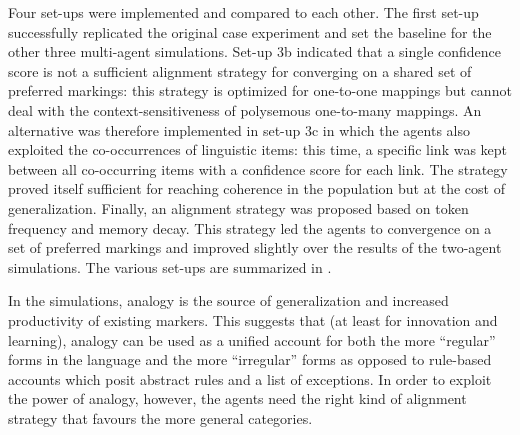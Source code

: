 Four set-ups were implemented and compared to each other. The first set-up successfully replicated the original case experiment and set the baseline for the other three multi-agent simulations. Set-up 3b indicated that a single confidence score is not a sufficient alignment strategy for converging on a shared set of preferred markings: this strategy is optimized for one-to-one mappings but cannot deal with the context-sensitiveness of polysemous one-to-many mappings. An alternative was therefore implemented in set-up 3c in which the agents also exploited the co-occurrences of linguistic items: this time, a specific link was kept between all co-occurring items with a confidence score for each link. The strategy proved itself sufficient for reaching coherence in the population but at the cost of generalization. Finally, an alignment strategy was proposed based on token frequency and memory decay. This strategy led the agents to convergence on a set of preferred markings and improved slightly over the results of the two-agent simulations. The various set-ups are summarized in .

In the simulations, analogy is the source of generalization and increased productivity of existing markers. This suggests that (at least for innovation and learning), analogy can be used as a unified account for both the more ``regular'' forms in the language and the more ``irregular'' forms as opposed to rule-based accounts which posit abstract rules and a list of exceptions. In order to exploit the power of analogy, however, the agents need the right kind of alignment strategy that favours the more general categories.

